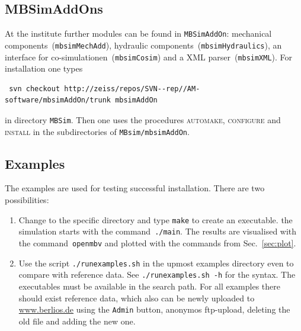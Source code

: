 \subsection{MBSimAddOns}
{\small At the institute further modules can be found in \texttt{MBSimAddOn}: mechanical components~(\texttt{mbsimMechAdd}), hydraulic components~(\texttt{mbsimHydraulics}), an interface for co-simulationen~(\texttt{mbsimCosim}) and a XML parser~(\texttt{mbsimXML}). For installation one types
\begin{verbatim}
 svn checkout http://zeiss/repos/SVN--rep//AM-software/mbsimAddOn/trunk mbsimAddOn
\end{verbatim}
in directory \texttt{MBSim}. Then one uses the procedures \textsc{automake, configure} and \textsc{install} in the subdirectories of \texttt{MBsim/mbsimAddOn}.
}

\subsection{\MBSim Examples}
The examples are used for testing successful installation. There are two possibilities:
\begin{enumerate}
\item Change to the specific directory and type \texttt{make} to create an executable. the simulation starts with the command~\texttt{./main}. The results are visualised with the command~\texttt{openmbv} and plotted with the commands from Sec.~\ref{sec:plot}.
\item Use the script \texttt{./runexamples.sh} in the upmost examples directory even to compare with reference data. See \texttt{./runexamples.sh -h} for the syntax. The \HDF{} executables must be available in the search path. For all examples there should exist reference data, which also can be newly uploaded to \url{www.berlios.de} using the \texttt{Admin} button, anonymos ftp-upload, deleting the old file and adding the new one.
\end{enumerate}
